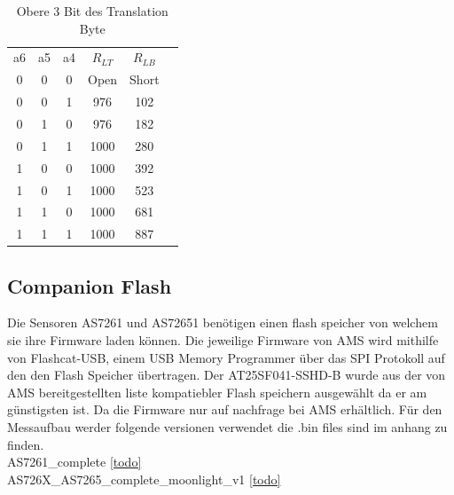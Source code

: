 \begin{table}[!ht]
\caption{Obere 3 Bit des Translation Byte}
\label{TranslationByte_Upper}
\centering
\begin{tabular}{c|c|c|c|c|c}
 a6 & a5 & a4 & $R_{LT}$ & $R_{LB}$\\
 0 & 0 & 0 & Open & Short \\ 
 0 & 0 & 1 & 976 & 102\\ 
 0 & 1 & 0 & 976 & 182\\
 0 & 1 & 1 & 1000 & 280\\ 
 1 & 0 & 0 & 1000 & 392\\ 
 1 & 0 & 1 & 1000 & 523\\ 
 1 & 1 & 0 & 1000 & 681\\ 
 1 & 1 & 1 & 1000 & 887\\

\end{tabular}
\end{table}

\subsection{Companion Flash}
Die Sensoren AS7261 und AS72651 benötigen einen flash speicher von welchem sie ihre Firmware laden können.
Die jeweilige Firmware von AMS wird mithilfe von Flashcat-USB, einem USB Memory Programmer über das SPI Protokoll auf den den Flash Speicher übertragen.
Der AT25SF041-SSHD-B wurde aus der von AMS bereitgestellten liste kompatiebler Flash speichern ausgewählt da er am günstigsten ist. 
Da die Firmware nur auf nachfrage bei AMS erhältlich. Für den Messaufbau werder folgende versionen verwendet die .bin files sind im anhang zu finden.\\
AS7261\_complete \ref{todo}\\
AS726X\_AS7265\_complete\_moonlight\_v1 \ref{todo}



